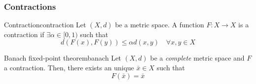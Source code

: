\documentclass[12pt]{extarticle}
\begin{document}
\subsubsection{Contractions}

\begin{definition}{Contraction}{contraction}
    Let $(X, d)$ be a metric space.
    A function $F: X \to X$ is a contraction if $\exists \alpha \in [0, 1)$
    such that
    \begin{equation}
        d(F(x), F(y)) \leq \alpha d(x, y) \quad \forall x, y \in X
    \end{equation}
\end{definition}

\begin{theorem}{Banach fixed-point theorem}{banach}
    Let $(X, d)$ be a \emph{complete} metric space and $F$ a contraction.
    Then, there exists an unique $\bar x \in X$ such that
    \begin{equation}
        F(\bar x) = \bar x
    \end{equation}
\end{theorem}
\end{document}
